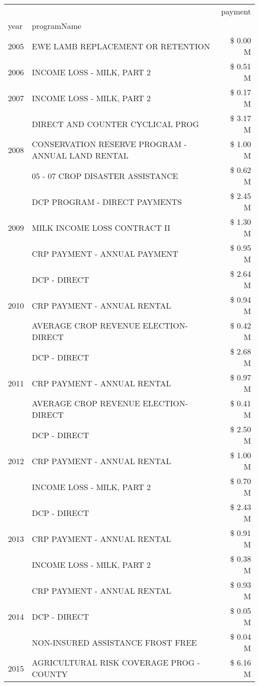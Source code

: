 \begin{tabular}{llr}
\toprule
 &  & payment \\
year & programName &  \\
\midrule
2005 & EWE LAMB REPLACEMENT OR RETENTION & \$ 0.00 M \\
\cline{1-3}
2006 & INCOME LOSS - MILK, PART 2 & \$ 0.51 M \\
\cline{1-3}
2007 & INCOME LOSS - MILK, PART 2 & \$ 0.17 M \\
\cline{1-3}
\multirow[t]{3}{*}{2008} & DIRECT AND COUNTER CYCLICAL PROG & \$ 3.17 M \\
 & CONSERVATION RESERVE PROGRAM - ANNUAL LAND RENTAL & \$ 1.00 M \\
 & 05 - 07 CROP DISASTER ASSISTANCE & \$ 0.62 M \\
\cline{1-3}
\multirow[t]{3}{*}{2009} & DCP PROGRAM - DIRECT PAYMENTS & \$ 2.45 M \\
 & MILK INCOME LOSS CONTRACT II & \$ 1.30 M \\
 & CRP PAYMENT - ANNUAL PAYMENT & \$ 0.95 M \\
\cline{1-3}
\multirow[t]{3}{*}{2010} & DCP - DIRECT & \$ 2.64 M \\
 & CRP PAYMENT - ANNUAL RENTAL & \$ 0.94 M \\
 & AVERAGE CROP REVENUE ELECTION-DIRECT & \$ 0.42 M \\
\cline{1-3}
\multirow[t]{3}{*}{2011} & DCP - DIRECT & \$ 2.68 M \\
 & CRP PAYMENT - ANNUAL RENTAL & \$ 0.97 M \\
 & AVERAGE CROP REVENUE ELECTION-DIRECT & \$ 0.41 M \\
\cline{1-3}
\multirow[t]{3}{*}{2012} & DCP - DIRECT & \$ 2.50 M \\
 & CRP PAYMENT - ANNUAL RENTAL & \$ 1.00 M \\
 & INCOME LOSS - MILK, PART 2 & \$ 0.70 M \\
\cline{1-3}
\multirow[t]{3}{*}{2013} & DCP - DIRECT & \$ 2.43 M \\
 & CRP PAYMENT - ANNUAL RENTAL & \$ 0.91 M \\
 & INCOME LOSS - MILK, PART 2 & \$ 0.38 M \\
\cline{1-3}
\multirow[t]{3}{*}{2014} & CRP PAYMENT - ANNUAL RENTAL & \$ 0.93 M \\
 & DCP - DIRECT & \$ 0.05 M \\
 & NON-INSURED ASSISTANCE FROST FREE & \$ 0.04 M \\
\cline{1-3}
\multirow[t]{3}{*}{2015} & AGRICULTURAL RISK COVERAGE PROG - COUNTY & \$ 6.16 M \\

\end{tabular}
